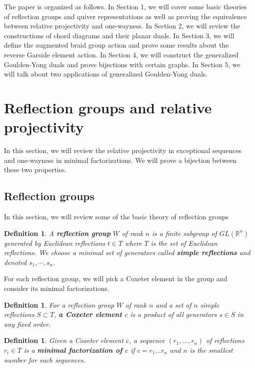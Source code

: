 \documentclass[11pt]{amsart}
\newtheorem{defi}[thm]{Definition}%
\begin{document}
The paper is organized as follows. In Section 1, we will cover some basic theories of reflection groups and quiver representations as well as proving the equivalence between relative projectivity and one-wayness. In Section 2, we will review the constructions of chord diagrams and their planar duals. In Section 3, we will define the augmented braid group action and prove some results about the reverse Garside element action. In Section 4, we will construct the generalized Goulden-Yong duals and prove bijections with certain graphs. In Section 5, we will talk about two applications of generalized Goulden-Yong duals.

\section{Reflection groups and relative projectivity}
In this section, we will review the relative projectivity in exceptional sequences and one-wayness in minimal factorizations. We will prove a bijection between these two properties.
\subsection{Reflection groups}
In this section, we will review some of the basic theory of reflection groups

\begin{defi}
    A \textbf{reflection group} $W$ of rank $n$ is a finite subgroup of $GL(\mathbb{R}^n)$ generated by Euclidean reflections $t \in T$ where $T$ is the set of Euclidean reflections. We choose a minimal set of generators called \textbf{simple reflections} and denoted $s_1,\cdots,s_n$.
\end{defi}

For each reflection group, we will pick a Coxeter element in the group and consider its minimal factorizations.

\begin{defi}
    For a reflection group $W$ of rank $n$ and a set of $n$ simple reflections $S \subset T$, \textbf{a Coxeter element $c$} is a product of all generators $s \in S$ in any fixed order.
\end{defi}

\begin{defi}
    Given a Coxeter element $c$, a sequence $(r_1,\dots,r_n)$ of reflections $r_i\in T$ is a \textbf{minimal factorization of $c$} if $c=r_1\dots r_n$ and $n$ is the smallest number for such sequences.
\end{defi}
\end{document}
